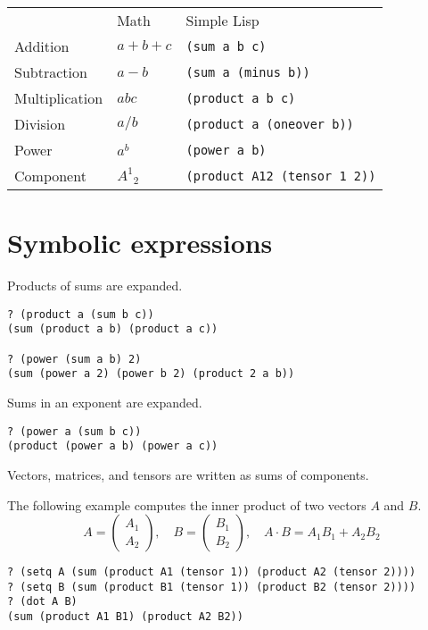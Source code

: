 \documentclass[12pt]{article}
\begin{document}
\begin{center}
\begin{tabular}{lll}
& Math & Simple Lisp
\\[1ex]
Addition & $a+b+c$ & \verb$(sum a b c)$
\\[1ex]
Subtraction & $a-b$ & \verb$(sum a (minus b))$
\\[1ex]
Multiplication & $abc$ & \verb$(product a b c)$
\\[1ex]
Division & $a/b$ & \verb$(product a (oneover b))$
\\[1ex]
Power & $a^b$ & \verb$(power a b)$
\\[1ex]
Component & $A^1{}_2$ & \verb$(product A12 (tensor 1 2))$
\end{tabular}
\end{center}

\section*{Symbolic expressions}

Products of sums are expanded.
\begin{verbatim}
? (product a (sum b c))
(sum (product a b) (product a c))

? (power (sum a b) 2)
(sum (power a 2) (power b 2) (product 2 a b))
\end{verbatim}

Sums in an exponent are expanded.
\begin{verbatim}
? (power a (sum b c))
(product (power a b) (power a c))
\end{verbatim}

Vectors, matrices, and tensors are written as sums of components.

\bigskip
The following example computes the inner product of two vectors $A$ and $B$.
\begin{equation*}
A=\begin{pmatrix}A_1\\A_2\end{pmatrix},
\quad
B=\begin{pmatrix}B_1\\B_2\end{pmatrix},
\quad
A\cdot B=A_1B_1+A_2B_2
\end{equation*}
\begin{verbatim}
? (setq A (sum (product A1 (tensor 1)) (product A2 (tensor 2))))
? (setq B (sum (product B1 (tensor 1)) (product B2 (tensor 2))))
? (dot A B)
(sum (product A1 B1) (product A2 B2))
\end{verbatim}
\end{document}

